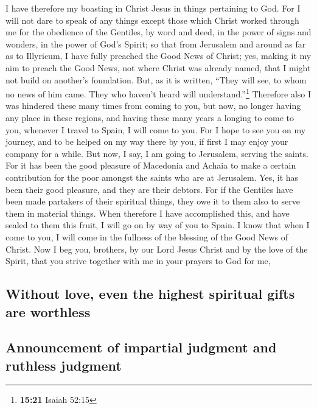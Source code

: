 I have therefore my boasting in Christ Jesus in things pertaining to
God.  For I will not dare to speak of any things except
those which Christ worked through me for the obedience of the Gentiles,
by word and deed,  in the power of signs and wonders, in
the power of God's Spirit; so that from Jerusalem and around as far as
to Illyricum, I have fully preached the Good News of Christ;
 yes, making it my aim to preach the Good News, not where
Christ was already named, that I might not build on another's
foundation.  But, as it is written, ``They will see, to
whom no news of him came. They who haven't heard will
understand.''\footnote{\textbf{15:21} Isaiah 52:15} 
Therefore also I was hindered these many times from coming to you,
 but now, no longer having any place in these regions,
and having these many years a longing to come to you, 
whenever I travel to Spain, I will come to you. For I hope to see you on
my journey, and to be helped on my way there by you, if first I may
enjoy your company for a while.  But now, I say, I am
going to Jerusalem, serving the saints.  For it has been
the good pleasure of Macedonia and Achaia to make a certain contribution
for the poor amongst the saints who are at Jerusalem. 
Yes, it has been their good pleasure, and they are their debtors. For if
the Gentiles have been made partakers of their spiritual things, they
owe it to them also to serve them in material things. 
When therefore I have accomplished this, and have sealed to them this
fruit, I will go on by way of you to Spain.  I know that
when I come to you, I will come in the fullness of the blessing of the
Good News of Christ.  Now I beg you, brothers, by our
Lord Jesus Christ and by the love of the Spirit, that you strive
together with me in your prayers to God for me,

\hypertarget{without-love-even-the-highest-spiritual-gifts-are-worthless}{%
\subsection{Without love, even the highest spiritual gifts are
worthless}\label{without-love-even-the-highest-spiritual-gifts-are-worthless}}

\hypertarget{announcement-of-impartial-judgment-and-ruthless-judgment}{%
\subsection{Announcement of impartial judgment and ruthless
judgment}\label{announcement-of-impartial-judgment-and-ruthless-judgment}}

